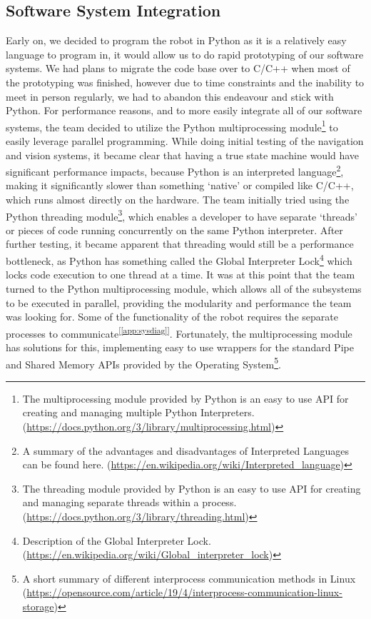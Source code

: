 \documentclass[11pt, hidelinks]{report}
\newcommand{\refapp}[1]{\textsuperscript{[\ref{#1}]}}
\begin{document}
\subsection{Software System Integration}
Early on, we decided to program the robot in Python as it is a relatively easy language to program in, it would allow us to do rapid prototyping of our software systems. We had plans to migrate the code base over to C/C++ when most of the prototyping was finished, however due to time constraints and the inability to meet in person regularly, we had to abandon this endeavour and stick with Python. For performance reasons, and to more easily integrate all of our software systems, the team decided to utilize the Python multiprocessing module\footnote{The multiprocessing module provided by Python is an easy to use API for creating and managing multiple Python Interpreters. (\url{https://docs.python.org/3/library/multiprocessing.html})} to easily leverage parallel programming. While doing initial testing of the navigation and vision systems, it became clear that having a true state machine would have significant performance impacts, because Python is an interpreted language\footnote{A summary of the advantages and disadvantages of Interpreted Languages can be found here. (\url{https://en.wikipedia.org/wiki/Interpreted\_language})}, making it significantly slower than something ‘native’ or compiled like C/C++, which runs almost directly on the hardware. The team initially tried using the Python threading module\footnote{The threading module provided by Python is an easy to use API for creating and managing separate threads within a process. (\url{https://docs.python.org/3/library/threading.html})}, which enables a developer to have separate ‘threads’ or pieces of code running concurrently on the same Python interpreter. After further testing, it became apparent that threading would still be a performance bottleneck, as Python has something called the Global Interpreter Lock\footnote{Description of the Global Interpreter Lock. (\url{https://en.wikipedia.org/wiki/Global\_interpreter\_lock})} which locks code execution to one thread at a time. It was at this point that the team turned to the Python multiprocessing module, which allows all of the subsystems to be executed in parallel, providing the modularity and performance the team was looking for. Some of the functionality of the robot requires the separate processes to communicate\refapp{app:sysdiag}. Fortunately, the multiprocessing module has solutions for this, implementing easy to use wrappers for the standard Pipe and Shared Memory APIs provided by the Operating System\footnote{A short summary of different interprocess communication methods in Linux (\url{https://opensource.com/article/19/4/interprocess-communication-linux-storage})}.
\end{document}
